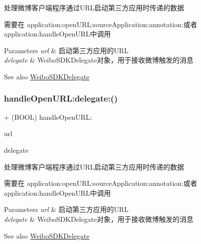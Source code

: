 处理微博客户端程序通过\+U\+R\+L启动第三方应用时传递的数据

需要在 application\+:open\+U\+R\+L\+:source\+Application\+:annotation\+:或者application\+:handle\+Open\+U\+R\+L中调用 
\begin{DoxyParams}{Parameters}
{\em url} & 启动第三方应用的\+U\+RL \\
\hline
{\em delegate} & Weibo\+S\+D\+K\+Delegate对象，用于接收微博触发的消息 \\
\hline
\end{DoxyParams}
\begin{DoxySeeAlso}{See also}
\mbox{\hyperlink{class_weibo_s_d_k_delegate-p}{Weibo\+S\+D\+K\+Delegate}} 
\end{DoxySeeAlso}
\mbox{\label{interface_weibo_s_d_k_a4a0d371f214612aa4c31ff1096796203}} 
\subsubsection{\texorpdfstring{handle\+Open\+U\+R\+L\+:delegate\+:()}{handleOpenURL:delegate:()}\hspace{0.1cm}{\footnotesize\ttfamily [3/3]}}
{\footnotesize\ttfamily + (B\+O\+OL) handle\+Open\+U\+R\+L\+: \begin{DoxyParamCaption}\item[{(N\+S\+U\+RL $\ast$)}]{url }\item[{delegate:(id$<$ Weibo\+S\+D\+K\+Delegate $>$)}]{delegate }\end{DoxyParamCaption}}

处理微博客户端程序通过\+U\+R\+L启动第三方应用时传递的数据

需要在 application\+:open\+U\+R\+L\+:source\+Application\+:annotation\+:或者application\+:handle\+Open\+U\+R\+L中调用 
\begin{DoxyParams}{Parameters}
{\em url} & 启动第三方应用的\+U\+RL \\
\hline
{\em delegate} & Weibo\+S\+D\+K\+Delegate对象，用于接收微博触发的消息 \\
\hline
\end{DoxyParams}
\begin{DoxySeeAlso}{See also}
\mbox{\hyperlink{class_weibo_s_d_k_delegate-p}{Weibo\+S\+D\+K\+Delegate}} 
\end{DoxySeeAlso}
\mbox{\label{interface_weibo_s_d_k_a12e37cf863202654e615232885fa596f}} 
